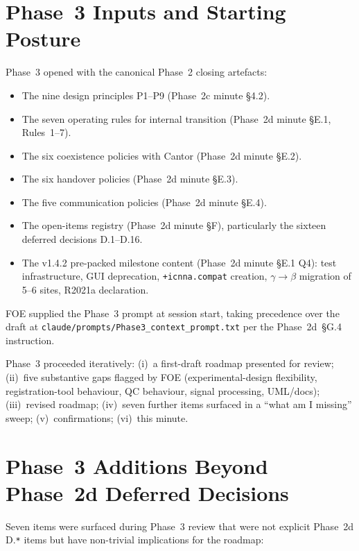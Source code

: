 \documentclass[11pt,a4paper]{article}
\begin{document}
\section{Phase~3 Inputs and Starting Posture}

Phase~3 opened with the canonical Phase~2 closing artefacts:

\begin{itemize}
    \item The nine design principles P1--P9 (Phase~2c minute \S4.2).
    \item The seven operating rules for internal transition (Phase~2d minute \S E.1, Rules~1--7).
    \item The six coexistence policies with Cantor (Phase~2d minute \S E.2).
    \item The six handover policies (Phase~2d minute \S E.3).
    \item The five communication policies (Phase~2d minute \S E.4).
    \item The open-items registry (Phase~2d minute \S F), particularly the sixteen deferred decisions D.1--D.16.
    \item The v1.4.2 pre-packed milestone content (Phase~2d minute \S E.1 Q4): test infrastructure, GUI deprecation, \texttt{+icnna.compat} creation, $\gamma\to\beta$ migration of 5--6 sites, R2021a declaration.
\end{itemize}

FOE supplied the Phase~3 prompt at session start, taking precedence over the draft at \texttt{claude/prompts/Phase3\_context\_prompt.txt} per the Phase~2d~\S G.4 instruction.

Phase~3 proceeded iteratively: (i)~a first-draft roadmap presented for review; (ii)~five substantive gaps flagged by FOE (experimental-design flexibility, registration-tool behaviour, QC behaviour, signal processing, UML/docs); (iii)~revised roadmap; (iv)~seven further items surfaced in a ``what am I missing'' sweep; (v)~confirmations; (vi)~this minute.

\section{Phase~3 Additions Beyond Phase~2d Deferred Decisions}
\label{sec:phase3additions}

Seven items were surfaced during Phase~3 review that were not explicit Phase~2d D.\texttt{*} items but have non-trivial implications for the roadmap:
\end{document}
